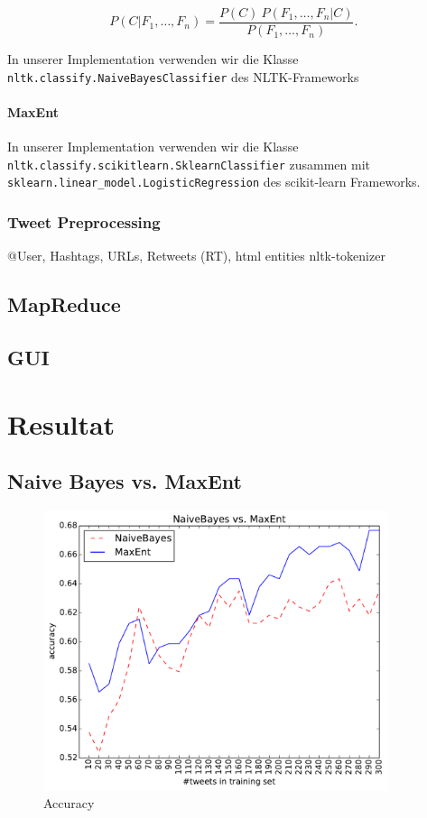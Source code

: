 \documentclass[12pt, oneside]{report}   	%
\begin{document}
$$
P(C \vert F_1,\dots,F_n) = \frac{P(C) \ P(F_1,\dots,F_n\vert C)}{P(F_1,\dots,F_n)}. \,
$$


In unserer Implementation verwenden wir die Klasse\\
 \verb|nltk.classify.NaiveBayesClassifier| des NLTK-Frameworks

\subsubsection{MaxEnt}
In unserer Implementation verwenden wir die Klasse\\
\verb|nltk.classify.scikitlearn.SklearnClassifier| zusammen mit\\
\verb|sklearn.linear_model.LogisticRegression| des scikit-learn Frameworks.

\subsection{Tweet Preprocessing}
@User, Hashtags, URLs, Retweets (RT), html entities
nltk-tokenizer

\section{MapReduce}

\section{GUI}


\chapter{Resultat}

\section{Naive Bayes vs. MaxEnt}

\begin{figure}[htbp]
\begin{center}
\includegraphics[width=0.9\textwidth]{bilder/cmp_nb_vs_me_S10_M300-16M.pdf}
\caption{Accuracy}
\label{img:acc}
\end{center}
\end{figure}
\end{document}
